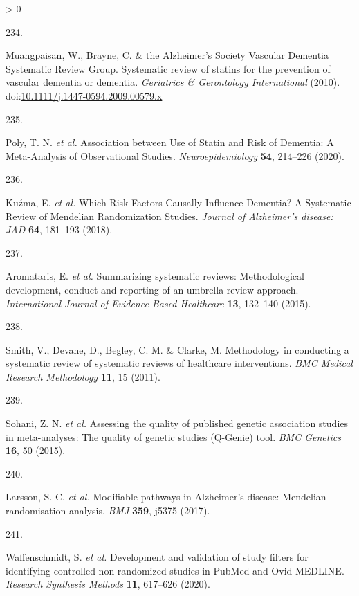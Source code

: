 \documentclass[a4paper, twoside]{templates/ociamthesis}
\newlength{\cslhangindent}
\newlength{\csllabelwidth}
\newenvironment{CSLReferences}[3] %
 {%
  \setlength{\parindent}{0pt}
  \ifodd #1 \everypar{\setlength{\hangindent}{\cslhangindent}}\ignorespaces\fi
  \ifnum #2 > 0
  \setlength{\parskip}{#2\baselineskip}
  \fi
 }%
 {}
\newcommand{\CSLLeftMargin}[1]{\parbox[t]{\maxof{\widthof{#1}}{\csllabelwidth}}{#1}}
\newcommand{\CSLRightInline}[1]{\parbox[t]{\linewidth - \csllabelwidth}{#1}}
\begin{document}
\begin{CSLReferences}{0}{0}
\leavevmode\hypertarget{ref-muangpaisan2010}{}%
\CSLLeftMargin{234. }
\CSLRightInline{Muangpaisan, W., Brayne, C. \& the Alzheimer's Society Vascular Dementia Systematic Review Group. Systematic review of statins for the prevention of vascular dementia or dementia. \emph{Geriatrics \& Gerontology International} (2010). doi:\href{https://doi.org/10.1111/j.1447-0594.2009.00579.x}{10.1111/j.1447-0594.2009.00579.x}}

\leavevmode\hypertarget{ref-poly2020}{}%
\CSLLeftMargin{235. }
\CSLRightInline{Poly, T. N. \emph{et al.} Association between {Use} of {Statin} and {Risk} of {Dementia}: {A Meta}-{Analysis} of {Observational Studies}. \emph{Neuroepidemiology} \textbf{54}, 214--226 (2020).}

\leavevmode\hypertarget{ref-kuzma2018a}{}%
\CSLLeftMargin{236. }
\CSLRightInline{Kuźma, E. \emph{et al.} Which {Risk Factors Causally Influence Dementia}? {A Systematic Review} of {Mendelian Randomization Studies}. \emph{Journal of Alzheimer's disease: JAD} \textbf{64}, 181--193 (2018).}

\leavevmode\hypertarget{ref-aromataris2015}{}%
\CSLLeftMargin{237. }
\CSLRightInline{Aromataris, E. \emph{et al.} Summarizing systematic reviews: Methodological development, conduct and reporting of an umbrella review approach. \emph{International Journal of Evidence-Based Healthcare} \textbf{13}, 132--140 (2015).}

\leavevmode\hypertarget{ref-smith2011}{}%
\CSLLeftMargin{238. }
\CSLRightInline{Smith, V., Devane, D., Begley, C. M. \& Clarke, M. Methodology in conducting a systematic review of systematic reviews of healthcare interventions. \emph{BMC Medical Research Methodology} \textbf{11}, 15 (2011).}

\leavevmode\hypertarget{ref-sohani2015}{}%
\CSLLeftMargin{239. }
\CSLRightInline{Sohani, Z. N. \emph{et al.} Assessing the quality of published genetic association studies in meta-analyses: The quality of genetic studies ({Q}-{Genie}) tool. \emph{BMC Genetics} \textbf{16}, 50 (2015).}

\leavevmode\hypertarget{ref-larsson2017b}{}%
\CSLLeftMargin{240. }
\CSLRightInline{Larsson, S. C. \emph{et al.} Modifiable pathways in {Alzheimer}'s disease: {Mendelian} randomisation analysis. \emph{BMJ} \textbf{359}, j5375 (2017).}

\leavevmode\hypertarget{ref-waffenschmidt2020}{}%
\CSLLeftMargin{241. }
\CSLRightInline{Waffenschmidt, S. \emph{et al.} Development and validation of study filters for identifying controlled non-randomized studies in {PubMed} and {Ovid MEDLINE}. \emph{Research Synthesis Methods} \textbf{11}, 617--626 (2020).}


\end{CSLReferences}
\end{document}
